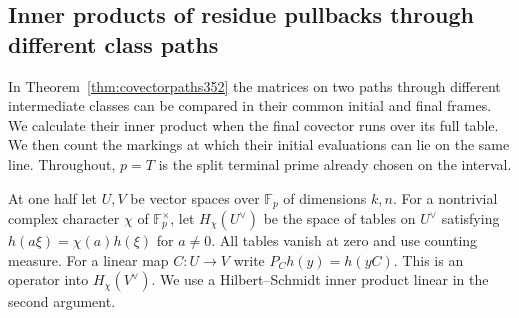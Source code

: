 \documentclass[a4paper,11pt]{article}
\theoremstyle{definition}
\theoremstyle{remark}
\numberwithin{equation}{section}
\begin{document}
\subsection{Inner products of residue pullbacks through different class paths}
\label{sec:pencil521}

In Theorem~\ref{thm:covectorpaths352} the matrices on two paths
through different intermediate classes can be compared in their common
initial and final frames. We calculate their inner product when the
final covector runs over its full table. We then count the markings at
which their initial evaluations can lie on the same line. Throughout,
\(p=T\) is the split terminal prime already chosen on the interval.

At one half let \(U,V\) be vector spaces over \(\mathbb F_p\) of
dimensions \(k,n\). For a nontrivial complex character \(\chi\) of
\(\mathbb F_p^\times\), let \(H_\chi(U^\vee)\) be the space of tables
on \(U^\vee\) satisfying \(h(a\xi)=\chi(a)h(\xi)\) for \(a\ne0\).
All tables vanish at zero and use counting measure. For a linear map
\(C:U\to V\) write \(P_Ch(y)=h(yC)\). This is an operator into
\(H_\chi(V^\vee)\). We use a Hilbert--Schmidt inner product linear in
the second argument.
\end{document}
